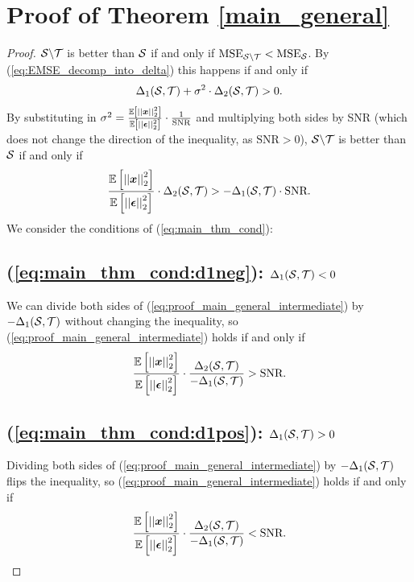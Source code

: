 {\color{black}
\section{Proof of Theorem \ref{main_general}}
\label{app:main_thm_proof}
\begin{proof}
    
$\mathcal{S} \backslash \mathcal{T}$ is better than $\mathcal{S}$ if and only if $\textrm{MSE}_{\mathcal{S}\backslash\mathcal{T}} < \textrm{MSE}_{
\mathcal{S}}$. By (\ref{eq:EMSE_decomp_into_delta}) this happens if and only if
\begin{equation}
    \Delta_{1}(\mathcal{S},\mathcal{T}) + \sigma^{2} \cdot \Delta_{2}(\mathcal{S},\mathcal{T}) > 0.
\end{equation}
By substituting in $\sigma^{2} = {\color{black} \frac{\expect{\sqnormvec{\vect{x}}}}{\expect{\sqnormvec{\vect{\epsilon}}}} }  \cdot \frac{1}{\textrm{SNR}}$ and multiplying both sides by SNR (which does not change the direction of the inequality, as $\textrm{SNR} > 0$), $\mathcal{S} \backslash \mathcal{T}$ is better than $\mathcal{S}$ if and only if
\begin{equation}
\label{eq:proof_main_general_intermediate}
   {\color{black} \frac{\expect{\sqnormvec{\vect{x}}}}{\expect{\sqnormvec{\vect{\epsilon}}}} } \cdot \Delta_{2}(\set{S},\set{T}) > -\Delta_{1}(\set{S},\set{T}) \cdot \textrm{SNR}. 
\end{equation}
We consider the conditions of (\ref{eq:main_thm_cond}):
\subsection*{\texorpdfstring{(\ref{eq:main_thm_cond:d1neg}): $\Delta_{1}(\mathcal{S},\mathcal{T}) < 0$}{(\ref{eq:main_thm_cond:d1neg}): \textDelta\textoneinferior(S,T) < 0}}
We can divide both sides of (\ref{eq:proof_main_general_intermediate}) by $-\Delta_{1}(\mathcal{S},\mathcal{T})$ without changing the inequality, so (\ref{eq:proof_main_general_intermediate}) holds if and only if
\begin{equation}
  {\color{black} \frac{\expect{\sqnormvec{\vect{x}}}}{\expect{\sqnormvec{\vect{\epsilon}}}} } \cdot \frac{\Delta_{2}(\set{S},\set{T})}{-\Delta_{1}(\set{S},\set{T})} >  \textrm{SNR}.
\end{equation}

\subsection*{\texorpdfstring{(\ref{eq:main_thm_cond:d1pos}): $\Delta_{1}(\mathcal{S},\mathcal{T}) > 0$}{(\ref{eq:main_thm_cond:d1pos}): \textDelta\textoneinferior(S,T) > 0}}
Dividing both sides of (\ref{eq:proof_main_general_intermediate}) by $-\Delta_{1}(\mathcal{S},\mathcal{T})$ flips the inequality, so (\ref{eq:proof_main_general_intermediate}) holds if and only if
\begin{equation}
  {\color{black} \frac{\expect{\sqnormvec{\vect{x}}}}{\expect{\sqnormvec{\vect{\epsilon}}}} } \cdot\frac{\Delta_{2}(\set{S},\set{T})}{-\Delta_{1}(\set{S},\set{T})} < \textrm{SNR}.
\end{equation}


\end{proof}}
